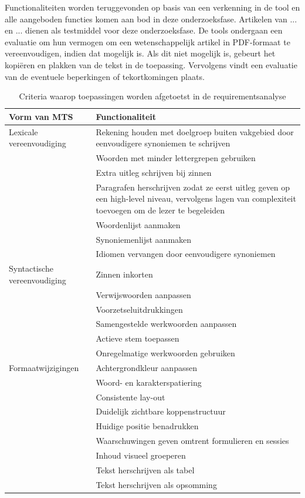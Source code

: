 \medspace

Functionaliteiten worden teruggevonden op basis van een verkenning in de tool en alle aangeboden functies komen aan bod in deze onderzoeksfase. Artikelen van ... en ... dienen als testmiddel voor deze onderzoeksfase. De tools ondergaan een evaluatie om hun vermogen om een wetenschappelijk artikel in PDF-formaat te vereenvoudigen, indien dat mogelijk is. Als dit niet mogelijk is, gebeurt het kopiëren en plakken van de tekst in de toepassing. Vervolgens vindt een evaluatie van de eventuele beperkingen of tekortkomingen plaats. 



\begin{center}
	\begin{table}[H]
		\begin{tabular}{ | m{4cm} | m{11cm} | } 
			\hline
			\textbf{Vorm van MTS} & \textbf{Functionaliteit} \\
			\hline
			Lexicale vereenvoudiging & Rekening houden met doelgroep buiten vakgebied door eenvoudigere synoniemen te schrijven \\
			& Woorden met minder lettergrepen gebruiken \\
			& Extra uitleg schrijven bij zinnen \\
			& Paragrafen herschrijven zodat ze eerst uitleg geven op een high-level niveau, vervolgens lagen van complexiteit toevoegen om de lezer te begeleiden \\
			& Woordenlijst aanmaken \\
			& Synoniemenlijst aanmaken \\
			& Idiomen vervangen door eenvoudigere synoniemen \\
			\hline
			Syntactische vereenvoudiging & Zinnen inkorten \\
			& Verwijswoorden aanpassen \\
			& Voorzetseluitdrukkingen \\
			& Samengestelde werkwoorden aanpassen \\
			& Actieve stem toepassen \\
			& Onregelmatige werkwoorden gebruiken \\
			\hline
			Formaatwijzigingen & Achtergrondkleur aanpassen \\
			& Woord- en karakterspatiering \\
			& Consistente lay-out \\
			& Duidelijk zichtbare koppenstructuur \\
			& Huidige positie benadrukken \\
			& Waarschuwingen geven omtrent formulieren en sessies \\
			& Inhoud visueel groeperen \\
			& Tekst herschrijven als tabel \\
			& Tekst herschrijven als opsomming \\
			\hline
		\end{tabular}
		\label{table:criteria-requirementsanalysis}	
		\caption{Criteria waarop toepassingen worden afgetoetst in de requirementsanalyse}
	\end{table}
\end{center}

